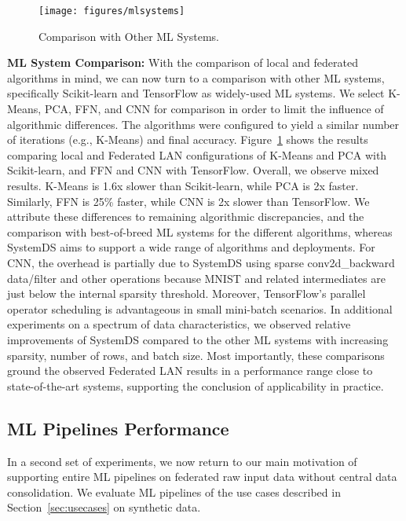 \documentclass[sigconf,screen]{acmart}
\begin{document}
\begin{figure}[!t]
	\centering
	\texttt{[image: figures/mlsystems]}
	\vspace{-0.25cm}
	\caption{\label{fig:exp3}Comparison with Other ML Systems.}
\end{figure}

\textbf{ML System Comparison:} With the comparison of local and federated algorithms in mind, we can now turn to a comparison with other ML systems, specifically Scikit-learn \cite{PedregosaVGMTGBPWDVPCBPD11} and TensorFlow \cite{AbadiBCCDDDGIIK16} as widely-used ML systems. We select K-Means, PCA, FFN, and CNN for comparison in order to limit the influence of algorithmic differences. The algorithms were configured to yield a similar number of iterations (e.g., K-Means) and final accuracy. Figure~\ref{fig:exp3} shows the results comparing local and Federated LAN configurations of K-Means and PCA with Scikit-learn, and FFN and CNN with TensorFlow. Overall, we observe mixed results. K-Means is 1.6x slower than Scikit-learn, while PCA is 2x faster. Similarly, FFN is 25\% faster, while CNN is 2x slower than TensorFlow. We attribute these differences to remaining algorithmic discrepancies, and the comparison with best-of-breed ML systems for the different algorithms, whereas SystemDS aims to support a wide range of algorithms and deployments. For CNN, the overhead is partially due to SystemDS using sparse conv2d\_backward data/filter and other operations because MNIST and related intermediates are just below the internal sparsity threshold. Moreover, TensorFlow's parallel operator scheduling is advantageous in small mini-batch scenarios. In additional experiments on a spectrum of data characteristics, we observed relative improvements of SystemDS compared to the other ML systems with increasing sparsity, number of rows, and batch size. Most importantly, these comparisons ground the observed Federated LAN results in a performance range close to state-of-the-art systems, supporting the conclusion of applicability in practice.

\subsection{ML Pipelines Performance}

In a second set of experiments, we now return to our main motivation of supporting entire ML pipelines on federated raw input data without central data consolidation. We evaluate ML pipelines of the use cases described in Section~\ref{sec:usecases} on synthetic data.
\end{document}
